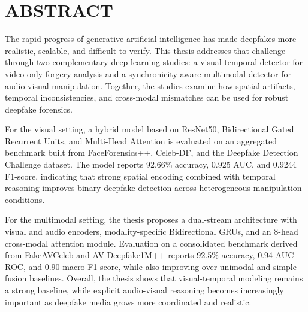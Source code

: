 \section*{ABSTRACT}
\noindent{\rule{\textwidth}{1.5pt}}

The rapid progress of generative artificial intelligence has made deepfakes more realistic, scalable, and difficult to verify. This thesis addresses that challenge through two complementary deep learning studies: a visual-temporal detector for video-only forgery analysis and a synchronicity-aware multimodal detector for audio-visual manipulation. Together, the studies examine how spatial artifacts, temporal inconsistencies, and cross-modal mismatches can be used for robust deepfake forensics.

For the visual setting, a hybrid model based on ResNet50, Bidirectional Gated Recurrent Units, and Multi-Head Attention is evaluated on an aggregated benchmark built from FaceForensics++, Celeb-DF, and the Deepfake Detection Challenge dataset. The model reports 92.66\% accuracy, 0.925 AUC, and 0.9244 F1-score, indicating that strong spatial encoding combined with temporal reasoning improves binary deepfake detection across heterogeneous manipulation conditions.

For the multimodal setting, the thesis proposes a dual-stream architecture with visual and audio encoders, modality-specific Bidirectional GRUs, and an 8-head cross-modal attention module. Evaluation on a consolidated benchmark derived from FakeAVCeleb and AV-Deepfake1M++ reports 92.5\% accuracy, 0.94 AUC-ROC, and 0.90 macro F1-score, while also improving over unimodal and simple fusion baselines. Overall, the thesis shows that visual-temporal modeling remains a strong baseline, while explicit audio-visual reasoning becomes increasingly important as deepfake media grows more coordinated and realistic.